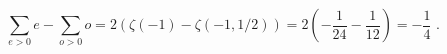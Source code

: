 \begin{equation}
\sum_{e>0}e-\sum_{o>0}o=2(\zeta (-1)-\zeta (-1,1/2))=2\left( -\frac{1}{24}-%
\frac{1}{12}\right) =-\frac{1}{4}\,\,.  \label{zeta-reg}
\end{equation}%
